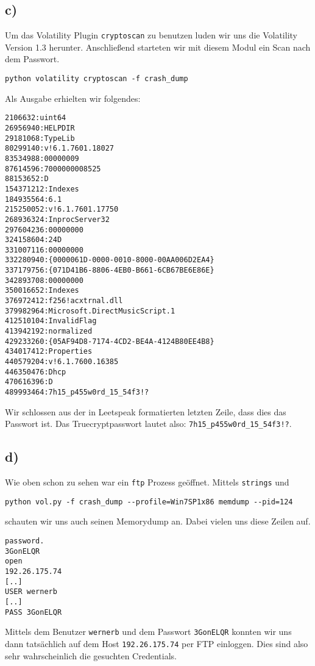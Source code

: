 \documentclass[10pt,a4paper]{article}
\begin{document}
\subsection*{c)}
Um das Volatility Plugin \texttt{cryptoscan} zu benutzen luden wir uns die Volatility Version 1.3 herunter. Anschließend starteten wir mit diesem Modul ein Scan nach dem Passwort.
\begin{verbatim}
python volatility cryptoscan -f crash_dump
\end{verbatim}
Als Ausgabe erhielten wir folgendes:
\begin{verbatim}
2106632:uint64
26956940:HELPDIR
29181068:TypeLib
80299140:v!6.1.7601.18027
83534988:00000009
87614596:7000000008525
88153652:D 
154371212:Indexes
184935564:6.1
215250052:v!6.1.7601.17750
268936324:InprocServer32
297604236:00000000
324158604:24D
331007116:00000000
332280940:{0000061D-0000-0010-8000-00AA006D2EA4}
337179756:{071D41B6-8806-4EB0-B661-6CB67BE6E86E}
342893708:00000000
350016652:Indexes
376972412:f256!acxtrnal.dll
379982964:Microsoft.DirectMusicScript.1
412510104:InvalidFlag
413942192:normalized
429233260:{05AF94D8-7174-4CD2-BE4A-4124B80EE4B8}
434017412:Properties
440579204:v!6.1.7600.16385
446350476:Dhcp
470616396:D 
489993464:7h15_p455w0rd_15_54f3!?
\end{verbatim}
Wir schlossen aus der in Leetspeak formatierten letzten Zeile, dass dies das Passwort ist.
Das Truecryptpasswort lautet also:
\texttt{7h15\_p455w0rd\_15\_54f3!?}.

\subsection*{d)}
Wie oben schon zu sehen war ein \texttt{ftp} Prozess geöffnet. Mittels \texttt{strings} und
\begin{verbatim}
python vol.py -f crash_dump --profile=Win7SP1x86 memdump --pid=124
\end{verbatim}
schauten wir uns auch seinen Memorydump an. Dabei vielen uns diese Zeilen auf.
\begin{verbatim}
password.
3GonELQR
open
192.26.175.74
[..]
USER wernerb
[..]
PASS 3GonELQR
\end{verbatim}
Mittels dem Benutzer \texttt{wernerb} und dem Passwort \texttt{3GonELQR} konnten wir uns dann tatsächlich auf dem Host \texttt{192.26.175.74} per FTP einloggen. Dies sind also sehr wahrscheinlich die gesuchten Credentials.
\end{document}
